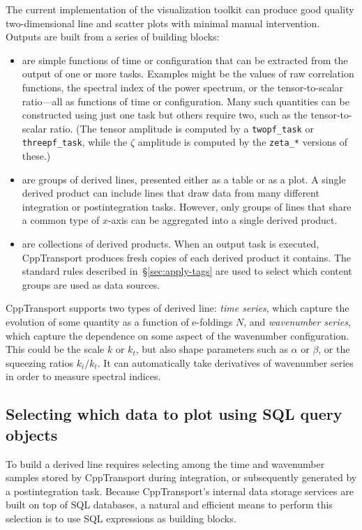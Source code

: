\documentclass[11pt,a4paper]{article}
\newcommand{\packagefont}{\sffamily}
\newcommand{\CppTransport}{{\packagefont CppTransport}}
\newcommand{\semibold}[1]{{\fontseries{b}\selectfont{#1}}}
\begin{document}
The current implementation of the visualization toolkit can
produce
good quality two-dimensional line and scatter plots
with minimal manual intervention.
Outputs are built from a series of building blocks:
\begin{itemize}
    \item \semibold{derived \emph{lines}} are simple functions of time
    or configuration that can be extracted from the output of one or more tasks.
    Examples might be
    the values of raw correlation functions,
    the spectral index of the power spectrum,
    or the tensor-to-scalar ratio---all as functions of time or configuration.
    Many such quantities can be constructed using just one task but others require
    two, such as the tensor-to-scalar ratio.
    (The tensor amplitude is computed by
    a \texttt{twopf_task} or
    \texttt{threepf_task}, while the $\zeta$ amplitude
    is computed by the
    \texttt{zeta_*} versions of these.)
    
    \item \semibold{derived \emph{products}} are groups of derived lines,
    presented either as a table or as a plot.
    A single derived product can include lines that draw data from many different
    integration or postintegration tasks.
    However, only groups of lines that share a common type of $x$-axis can be
    aggregated into a single derived product.
    
    \item \semibold{output tasks} are collections of derived products.
    When an output task is executed, {\CppTransport}
    produces fresh copies of each derived product it contains.
    The standard rules described in~\S\ref{sec:apply-tags}
    are used to select which content groups are used as data sources.
\end{itemize}
{\CppTransport} supports two types of derived line:
\emph{time series}, which capture the evolution of some quantity as a function
of e-foldings $N$, and
\emph{wavenumber series},
which capture the dependence on some aspect of the wavenumber configuration.
This could be the scale $k$ or $k_t$, but also shape parameters such as
$\alpha$ or $\beta$, or the squeezing ratios $k_i/k_t$.
It can automatically take derivatives of wavenumber series in order to
measure spectral indices.

\subsection{Selecting which data to plot using SQL query objects}
To build a derived line requires selecting among the time and wavenumber samples
stored by {\CppTransport} during integration,
or subsequently generated by a postintegration task.
Because {\CppTransport}'s internal data storage services are built on top of
SQL databases, a natural and efficient
means to perform this selection is to use
SQL expressions as building blocks.
\end{document}
